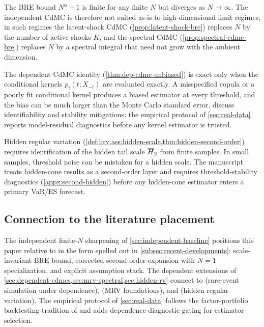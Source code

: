 The BRE bound $N^\alpha-1$ is finite for any finite $N$ but diverges as
$N\to\infty$. The independent CdMC is therefore not suited as-is to
high-dimensional limit regimes; in such regimes the latent-shock CdMC
(\cref{prop:latent-shock-bre}) replaces $N$ by the number of active shocks
$K$, and the spectral CdMC (\cref{prop:spectral-cdmc-bre}) replaces $N$ by a
spectral integral that need not grow with the ambient dimension.

The dependent CdMC identity (\cref{thm:dep-cdmc-unbiased}) is exact only when
the conditional kernels $p_i(t;X_{-i})$ are evaluated exactly. A
misspecified copula or a poorly fit conditional kernel produces a biased
estimator at every threshold, and the bias can be much larger than the Monte
Carlo standard error. 
discuss identifiability and stability mitigations; the empirical protocol of
\cref{sec:real-data} reports model-residual diagnostics before any kernel
estimator is trusted.

Hidden regular variation
(\cref{def:hrv,ass:hidden-scale,thm:hidden-second-order}) requires
identification of the hidden tail scale $\overline{H}_2$ from finite samples. In
small samples, threshold noise can be mistaken for a hidden scale. The
manuscript treats hidden-cone results as a second-order layer and requires
threshold-stability diagnostics (\cref{appx:second-hidden}) before any
hidden-cone estimator enters a primary VaR/ES forecast.

\subsection{Connection to the literature placement}

The independent finite-$N$ sharpening of \cref{sec:independent-baseline}
positions this paper relative to \citet{PourbabaeeSolari2019} in the form
spelled out in \cref{subsec:recent-developments}: scale-invariant BRE bound,
corrected second-order expansion with $N=1$ specialization, and explicit
assumption stack. The dependent extensions of
\cref{sec:dependent-cdmcs,sec:mrv-spectral,sec:hidden-rv} connect to
\citet{AsmussenKroese2006,HartingerKortschak2009,BlanchetRojasNandayapa2011,ChengFuhPang2025}
(rare-event simulation under dependence),
\citet{HultLindskogMikoschSamorodnitsky2005,Resnick2007,SamorodnitskySun2016}
(MRV foundations), and
\citet{LedfordTawn1996,MaulikResnick2005,DasMitraResnick2013}
(hidden regular variation). The empirical protocol of \cref{sec:real-data}
follows the factor-portfolio backtesting tradition of
\citet{McNeilFreyEmbrechts2015,GlassermanHeidelbergerShahabuddin2002} and
adds dependence-diagnostic gating for estimator selection.

